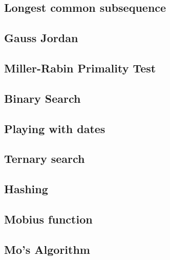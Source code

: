 \subsection{Longest common subsequence}
\raggedbottom
\hrulefill
\subsection{Gauss Jordan}
\raggedbottom
\hrulefill
\subsection{Miller-Rabin Primality Test}
\raggedbottom
\hrulefill
\subsection{Binary Search}
\raggedbottom
\hrulefill
\subsection{Playing with dates}
\raggedbottom
\hrulefill
\subsection{Ternary search}
\raggedbottom
\hrulefill
\subsection{Hashing}
\raggedbottom
\hrulefill
\subsection{Mobius function}
\raggedbottom
\hrulefill
\subsection{Mo's Algorithm}
\raggedbottom
\hrulefill

